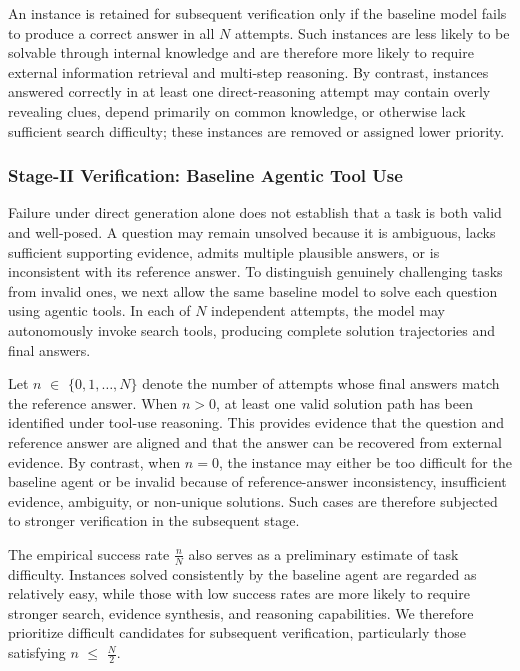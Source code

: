 \documentclass{huawei}
\begin{document}
An instance is retained for subsequent verification only if the baseline model fails to produce a correct answer in all $N$ attempts. Such instances are less likely to be solvable through internal knowledge and are therefore more likely to require external information retrieval and multi-step reasoning. By contrast, instances answered correctly in at least one direct-reasoning attempt may contain overly revealing clues, depend primarily on common knowledge, or otherwise lack sufficient search difficulty; these instances are removed or assigned lower priority.


\subsubsection{Stage-II Verification: Baseline Agentic Tool Use}
Failure under direct generation alone does not establish that a task is both valid and well-posed. A question may remain unsolved because it is ambiguous, lacks sufficient supporting evidence, admits multiple plausible answers, or is inconsistent with its reference answer. To distinguish genuinely challenging tasks from invalid ones, we next allow the same baseline model to solve each question using agentic tools. In each of $N$ independent attempts, the model may autonomously invoke search tools, producing complete solution trajectories and final answers.


Let $n$ $\in$ $\{0,1,\ldots,N\}$ denote the number of attempts whose final answers match the reference answer. When $n>0$, at least one valid solution path has been identified under tool-use reasoning. This provides evidence that the question and reference answer are aligned and that the answer can be recovered from external evidence. By contrast, when $n=0$, the instance may either be too difficult for the baseline agent or be invalid because of reference-answer inconsistency, insufficient evidence, ambiguity, or non-unique solutions. Such cases are therefore subjected to stronger verification in the subsequent stage.




The empirical success rate $\frac{n}{N}$ also serves as a preliminary estimate of task difficulty. Instances solved consistently by the baseline agent are regarded as relatively easy, while those with low success rates are more likely to require stronger search, evidence synthesis, and reasoning capabilities. We therefore prioritize difficult candidates for subsequent verification, particularly those satisfying $n$ $\leq$ $\frac{N}{2}$.
\end{document}
